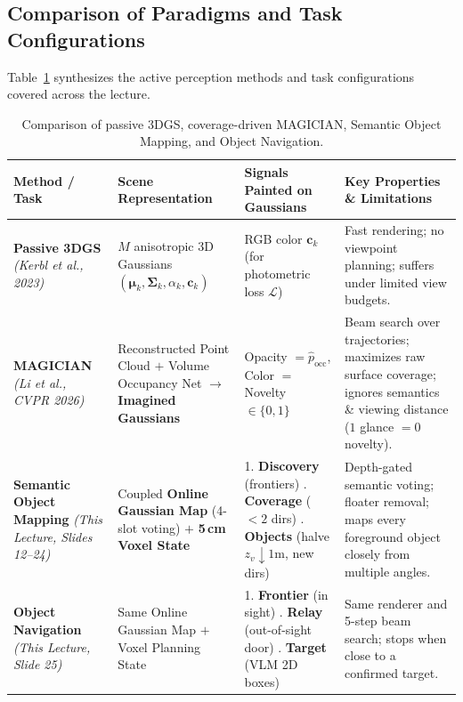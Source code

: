 \documentclass[11pt,a4paper]{article}
\theoremstyle{definition}
\theoremstyle{plain}
\theoremstyle{remark}
\begin{document}
\subsection{Comparison of Paradigms and Task Configurations}

Table~\ref{tab:comparison} synthesizes the active perception methods and task configurations covered across the lecture.

\begin{table}[htbp]
\centering
\small
\renewcommand{\arraystretch}{1.35}
\begin{tabular}{p{3.0cm} p{3.4cm} p{3.6cm} p{4.0cm}}
\toprule
\textbf{Method / Task} & \textbf{Scene Representation} & \textbf{Signals Painted on Gaussians} & \textbf{Key Properties \& Limitations} \\
\midrule
\textbf{Passive 3DGS} \newline \emph{(Kerbl et al., 2023)} & $M$ anisotropic 3D Gaussians $(\boldsymbol{\mu}_k, \boldsymbol{\Sigma}_k, \alpha_k, \mathbf{c}_k)$ & RGB color $\mathbf{c}_k$ (for photometric loss $\mathcal{L}$) & Fast rendering; no viewpoint planning; suffers under limited view budgets. \\
\addlinespace[3pt]
\textbf{MAGICIAN} \newline \emph{(Li et al., CVPR 2026)} & Reconstructed Point Cloud $+$ Volume Occupancy Net $\to$ \textbf{Imagined Gaussians} & Opacity $= \hat{p}_{\text{occ}}$, \newline Color $=$ Novelty $\in \{0,1\}$ & Beam search over trajectories; maximizes raw surface coverage; ignores semantics \& viewing distance ($1$ glance $= 0$ novelty). \\
\addlinespace[3pt]
\textbf{Semantic Object Mapping} \newline \emph{(This Lecture, Slides 12--24)} & Coupled \textbf{Online Gaussian Map} (4-slot voting) $+$ \textbf{5\,cm Voxel State} & 1. \textbf{Discovery} (frontiers) \newline 2. \textbf{Coverage} ($<2$ dirs) \newline 3. \textbf{Objects} (halve $z_v \downarrow 1\text{m}$, new dirs) & Depth-gated semantic voting; floater removal; maps every foreground object closely from multiple angles. \\
\addlinespace[3pt]
\textbf{Object Navigation} \newline \emph{(This Lecture, Slide 25)} & Same Online Gaussian Map $+$ Voxel Planning State & 1. \textbf{Frontier} (in sight) \newline 2. \textbf{Relay} (out-of-sight door) \newline 3. \textbf{Target} (VLM 2D boxes) & Same renderer and 5-step beam search; stops when close to a confirmed target. \\
\bottomrule
\end{tabular}
\caption{Comparison of passive 3DGS, coverage-driven MAGICIAN, Semantic Object Mapping, and Object Navigation.}
\label{tab:comparison}
\end{table}
\end{document}
